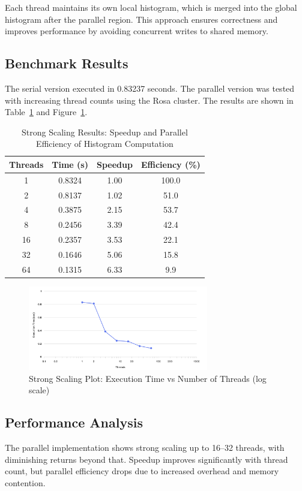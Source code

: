 \documentclass[unicode,11pt,a4paper,oneside,numbers=endperiod,openany]{scrartcl}
\begin{document}
Each thread maintains its own local histogram, which is merged into the global histogram after the parallel region. This approach ensures correctness and improves performance by avoiding concurrent writes to shared memory.

\subsection{Benchmark Results}
The serial version executed in 0.83237 seconds. The parallel version was tested with increasing thread counts using the Rosa cluster. The results are shown in Table~\ref{tab:scaling} and Figure~\ref{fig:scaling}.

\begin{table}[h!]
\centering
\begin{tabular}{|c|c|c|c|}
\hline
\textbf{Threads} & \textbf{Time (s)} & \textbf{Speedup} & \textbf{Efficiency (\%)} \\
\hline
1   & 0.8324 & 1.00  & 100.0 \\
2   & 0.8137 & 1.02  & 51.0  \\
4   & 0.3875 & 2.15  & 53.7  \\
8   & 0.2456 & 3.39  & 42.4  \\
16  & 0.2357 & 3.53  & 22.1  \\
32  & 0.1646 & 5.06  & 15.8  \\
64  & 0.1315 & 6.33  & 9.9   \\
\hline
\end{tabular}
\caption{Strong Scaling Results: Speedup and Parallel Efficiency of Histogram Computation}
\label{tab:scaling}
\end{table}

\begin{figure}[h!]
\centering
\includegraphics[width=0.7\textwidth]{./figures/Figure 8: strong_scaling_plot.png}
\caption{Strong Scaling Plot: Execution Time vs Number of Threads (log scale)}
\label{fig:scaling}
\end{figure}

\subsection{Performance Analysis}
The parallel implementation shows strong scaling up to 16–32 threads, with diminishing returns beyond that. Speedup improves significantly with thread count, but parallel efficiency drops due to increased overhead and memory contention.
\end{document}
